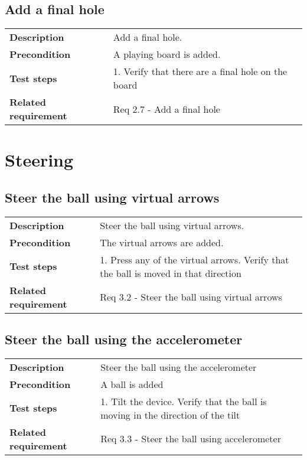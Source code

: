 \documentclass[a4paper,titlepage]{article}
\begin{document}
\subsection{Add a final hole}
\begin{tabularx}{\textwidth}{lX}
	\textbf{Description}	&
		Add a final hole.\\
	\textbf{Precondition}	&
		A playing board is added.\\
	\textbf{Test steps}	&
		1. Verify that there are a final hole on the board\\
	\textbf{Related requirement}	&
		Req 2.7 - Add a final hole\\
\end{tabularx}


\newpage
\section{Steering}
\subsection{Steer the ball using virtual arrows}
\begin{tabularx}{\textwidth}{lX}
	\textbf{Description}	&
		Steer the ball using virtual arrows.\\
	\textbf{Precondition}	&
		The virtual arrows are added.\\
	\textbf{Test steps}	&
		1. Press any of the virtual arrows\newline
		2. Verify that the ball is moved in that direction\\
	\textbf{Related requirement}	&
		Req 3.2 - Steer the ball using virtual arrows \\
\end{tabularx}

\subsection{Steer the ball using the accelerometer}
\begin{tabularx}{\textwidth}{lX}
	\textbf{Description}	&
		Steer the ball using the accelerometer\\
	\textbf{Precondition}	&
		A ball is added\\
	\textbf{Test steps}	&
		1. Tilt the device\newline
		2. Verify that the ball is moving in the direction of the tilt\\
	\textbf{Related requirement}	&
		Req 3.3 - Steer the ball using accelerometer\\
\end{tabularx}
\end{document}
